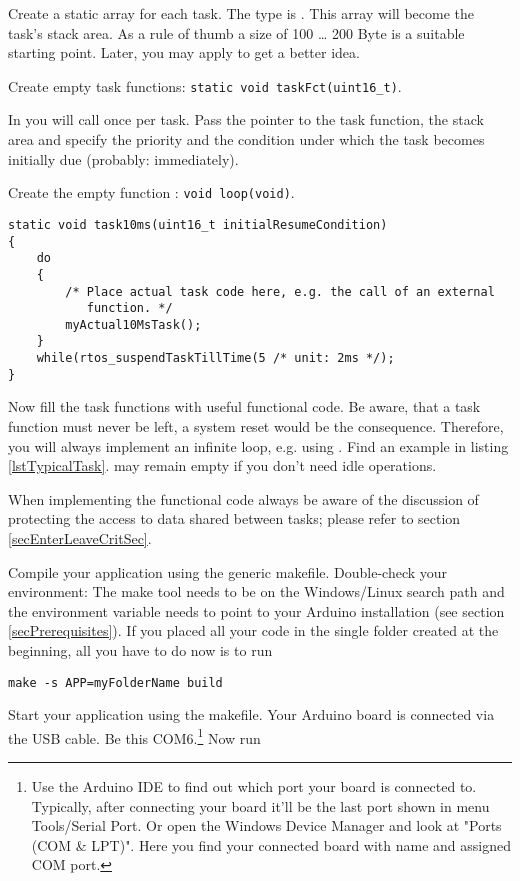 Create a static array for each task. The type is . This
array will become the task's stack area. As a rule of thumb a size of 100
\ldots{} 200 Byte is a suitable starting point. Later, you may apply
 to get a better idea.

Create empty task functions: \verb+static void taskFct(uint16_t)+.

In  you will call  once per task.
Pass the pointer to the task function, the stack area and specify the
priority and the condition under which the task becomes initially due
(probably: immediately).

Create the empty function : \verb+void loop(void)+.

\begin{lstlisting}[float, caption={Typical task, regularly activated},
label=lstTypicalTask, captionpos=b]
static void task10ms(uint16_t initialResumeCondition)
{
    do
    {
        /* Place actual task code here, e.g. the call of an external
           function. */
        myActual10MsTask();
    }
    while(rtos_suspendTaskTillTime(5 /* unit: 2ms */);
}
\end{lstlisting}


Now fill the task functions with useful functional code. Be aware,
that a task function must never be left, a system reset would be the
consequence. Therefore, you will always implement an infinite loop, e.g.
using . Find an example in listing
\ref{lstTypicalTask}.  may remain empty if you don't need idle
operations.

When implementing the functional code always be aware of the discussion of
protecting the access to data shared between tasks; please refer to
section \ref{secEnterLeaveCritSec}.

Compile your application using the generic makefile. Double-check your
environment: The make tool needs to be on the Windows/Linux search path
and the environment variable  needs to point to your
Arduino installation (see section \ref{secPrerequisites}). If you placed
all your code in the single folder created at the beginning, all you have
to do now is to run

\verb+make -s APP=myFolderName build+

Start your application using the makefile. Your Arduino board is connected
via the USB cable. Be this COM6.\footnote{Use the Arduino IDE to find out
which port your board is connected to. Typically, after connecting your board
it'll be the last port shown in menu Tools/Serial Port. Or open the
Windows Device Manager and look at "Ports (COM \& LPT)". Here you find your
connected board with name and assigned COM port.} Now run

